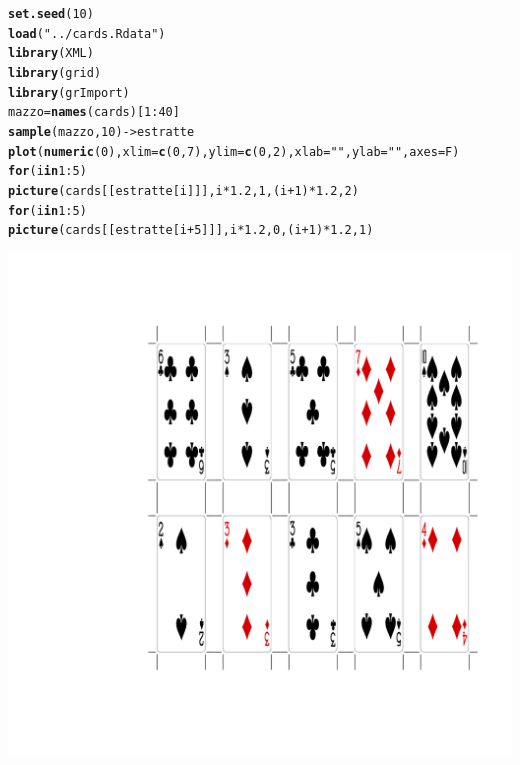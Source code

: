 \documentclass[onecolumn,12pt]{book}\usepackage[]{graphicx}\usepackage[]{color}
\makeatletter
\def\maxwidth{ %
  \ifdim\Gin@nat@width>\linewidth
    \linewidth
  \else
    \Gin@nat@width
  \fi
}
\newcommand{\hlnum}[1]{\textcolor[rgb]{0.686,0.059,0.569}{#1}}%
\newcommand{\hlstr}[1]{\textcolor[rgb]{0.192,0.494,0.8}{#1}}%
\newcommand{\hlopt}[1]{\textcolor[rgb]{0,0,0}{#1}}%
\newcommand{\hlstd}[1]{\textcolor[rgb]{0.345,0.345,0.345}{#1}}%
\newcommand{\hlkwa}[1]{\textcolor[rgb]{0.161,0.373,0.58}{\textbf{#1}}}%
\newcommand{\hlkwb}[1]{\textcolor[rgb]{0.69,0.353,0.396}{#1}}%
\newcommand{\hlkwc}[1]{\textcolor[rgb]{0.333,0.667,0.333}{#1}}%
\newcommand{\hlkwd}[1]{\textcolor[rgb]{0.737,0.353,0.396}{\textbf{#1}}}%
\newenvironment{kframe}{%
 \def\at@end@of@kframe{}%
 \ifinner\ifhmode%
  \def\at@end@of@kframe{\end{minipage}}%
  \begin{minipage}{\columnwidth}%
 \fi\fi%
 \def\FrameCommand##1{\hskip\@totalleftmargin \hskip-\fboxsep
 \colorbox{shadecolor}{##1}\hskip-\fboxsep
     \hskip-\linewidth \hskip-\@totalleftmargin \hskip\columnwidth}%
 \MakeFramed {\advance\hsize-\width
   \@totalleftmargin\z@ \linewidth\hsize
   \@setminipage}}%
 {\par\unskip\endMakeFramed%
 \at@end@of@kframe}
\newenvironment{knitrout}{}{} %
\makeatother
\begin{document}
\begin{knitrout}
\color{fgcolor}\begin{kframe}
\begin{alltt}
\hlkwd{set.seed}\hlstd{(}\hlnum{10}\hlstd{)}
\hlkwd{load}\hlstd{(}\hlstr{"../cards.Rdata"}\hlstd{)}
\hlkwd{library}\hlstd{(XML)}
\hlkwd{library}\hlstd{(grid)}
\hlkwd{library}\hlstd{(grImport)}
\hlstd{mazzo}\hlkwb{=}\hlkwd{names}\hlstd{(cards)[}\hlnum{1}\hlopt{:}\hlnum{40}\hlstd{]}
\hlkwd{sample}\hlstd{(mazzo,}\hlnum{10}\hlstd{)}\hlkwb{->}\hlstd{estratte}
\hlkwd{plot}\hlstd{(}\hlkwd{numeric}\hlstd{(}\hlnum{0}\hlstd{),}\hlkwc{xlim}\hlstd{=}\hlkwd{c}\hlstd{(}\hlnum{0}\hlstd{,}\hlnum{7}\hlstd{),}\hlkwc{ylim}\hlstd{=}\hlkwd{c}\hlstd{(}\hlnum{0}\hlstd{,}\hlnum{2}\hlstd{),}\hlkwc{xlab}\hlstd{=}\hlstr{""}\hlstd{,}\hlkwc{ylab}\hlstd{=}\hlstr{""}\hlstd{,}\hlkwc{axes}\hlstd{=F)}
\hlkwa{for} \hlstd{(i} \hlkwa{in} \hlnum{1}\hlopt{:}\hlnum{5}\hlstd{)}
\hlkwd{picture}\hlstd{(cards[[estratte[i]]],i}\hlopt{*}\hlnum{1.2}\hlstd{,}\hlnum{1}\hlstd{,(i}\hlopt{+}\hlnum{1}\hlstd{)}\hlopt{*}\hlnum{1.2}\hlstd{,}\hlnum{2}\hlstd{)}
\hlkwa{for} \hlstd{(i} \hlkwa{in} \hlnum{1}\hlopt{:}\hlnum{5}\hlstd{)}
\hlkwd{picture}\hlstd{(cards[[estratte[i}\hlopt{+}\hlnum{5}\hlstd{]]],i}\hlopt{*}\hlnum{1.2}\hlstd{,}\hlnum{0}\hlstd{,(i}\hlopt{+}\hlnum{1}\hlstd{)}\hlopt{*}\hlnum{1.2}\hlstd{,}\hlnum{1}\hlstd{)}
\end{alltt}
\end{kframe}
\includegraphics[width=\maxwidth]{figure/unnamed-chunk-8-1} 

\end{knitrout}
\end{document}

